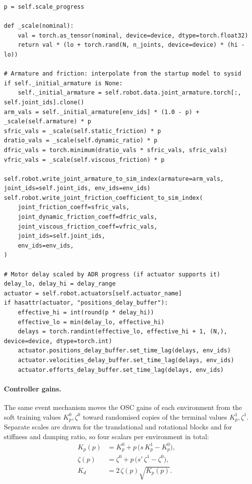 \begin{snippetbox}[11]
\begin{lstlisting}[firstnumber=1701]
p = self.scale_progress

def _scale(nominal):
    val = torch.as_tensor(nominal, device=device, dtype=torch.float32)
    return val * (lo + torch.rand(N, n_joints, device=device) * (hi - lo))

# Armature and friction: interpolate from the startup model to sysid
if self._initial_armature is None:
    self._initial_armature = self.robot.data.joint_armature.torch[:, self.joint_ids].clone()
arm_vals = self._initial_armature[env_ids] * (1.0 - p) + _scale(self.armature) * p
sfric_vals = _scale(self.static_friction) * p
dratio_vals = _scale(self.dynamic_ratio) * p
dfric_vals = torch.minimum(dratio_vals * sfric_vals, sfric_vals)
vfric_vals = _scale(self.viscous_friction) * p

self.robot.write_joint_armature_to_sim_index(armature=arm_vals, joint_ids=self.joint_ids, env_ids=env_ids)
self.robot.write_joint_friction_coefficient_to_sim_index(
    joint_friction_coeff=sfric_vals,
    joint_dynamic_friction_coeff=dfric_vals,
    joint_viscous_friction_coeff=vfric_vals,
    joint_ids=self.joint_ids,
    env_ids=env_ids,
)

# Motor delay scaled by ADR progress (if actuator supports it)
delay_lo, delay_hi = delay_range
actuator = self.robot.actuators[self.actuator_name]
if hasattr(actuator, "positions_delay_buffer"):
    effective_hi = int(round(p * delay_hi))
    effective_lo = min(delay_lo, effective_hi)
    delays = torch.randint(effective_lo, effective_hi + 1, (N,), device=device, dtype=torch.int)
    actuator.positions_delay_buffer.set_time_lag(delays, env_ids)
    actuator.velocities_delay_buffer.set_time_lag(delays, env_ids)
    actuator.efforts_delay_buffer.set_time_lag(delays, env_ids)
\end{lstlisting}
\end{snippetbox}

\paragraph{Controller gains.} The same event mechanism moves the OSC gains of each environment from the soft training values $K_p^0,\zeta^0$ toward randomised copies of the terminal values $K_p^1,\zeta^1$. Separate scales are drawn for the translational and rotational blocks and for stiffness and damping ratio, so four scalars per environment in total:
\begin{equation}
\begin{aligned}
  K_p(p) &= K_p^0 + p\,\big(s\,K_p^1 - K_p^0\big),\\
  \zeta(p) &= \zeta^0 + p\,\big(s'\,\zeta^1 - \zeta^0\big),\\
  K_d &= 2\,\zeta(p)\sqrt{K_p(p)}.
\end{aligned}
\end{equation}

